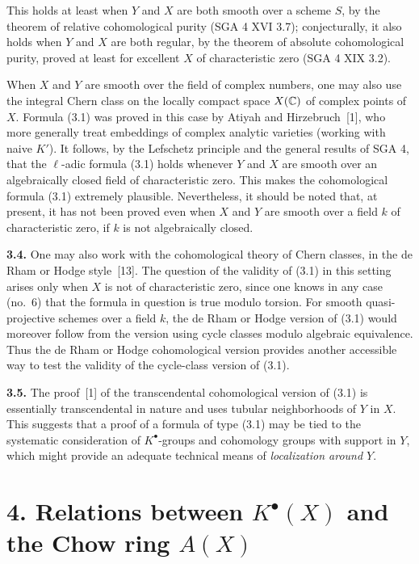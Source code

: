 This holds at least when $Y$ and $X$ are both smooth over a scheme $S$, by the
theorem of relative cohomological purity (SGA 4 XVI 3.7); conjecturally, it
also holds when $Y$ and $X$ are both regular, by the theorem of absolute
cohomological purity, proved at least for excellent $X$ of characteristic
zero (SGA 4 XIX 3.2).

When $X$ and $Y$ are smooth over the field of complex numbers, one may also
use the integral Chern class on the locally compact space $X(\mathbb C)$ of complex
points of $X$. Formula (3.1) was proved in this case by Atiyah and
Hirzebruch~[1], who more generally treat embeddings of complex analytic
varieties (working with naive $K'$). It follows, by the Lefschetz principle
and the general results of SGA 4, that the $\ell$-adic formula (3.1) holds
whenever $Y$ and $X$ are smooth over an algebraically closed field of
characteristic zero. This makes the cohomological formula (3.1) extremely
plausible. Nevertheless, it should be noted that, at present, it has not been
proved even when $X$ and $Y$ are smooth over a field $k$ of characteristic
zero, if $k$ is not algebraically closed.

\noindent\textbf{3.4.}
One may also work with the cohomological theory of Chern classes, in the de
Rham or Hodge style~[13]. The question of the validity of (3.1) in this
setting arises only when $X$ is not of characteristic zero, since one knows
in any case (no.~6) that the formula in question is true modulo torsion. For
smooth quasi-projective schemes over a field $k$, the de Rham or Hodge
version of (3.1) would moreover follow from the version using cycle classes
modulo algebraic equivalence. Thus the de Rham or Hodge cohomological version
provides another accessible way to test the validity of the cycle-class
version of (3.1).

\noindent\textbf{3.5.}
The proof~[1] of the transcendental cohomological version of (3.1) is
essentially transcendental in nature and uses tubular neighborhoods of $Y$
in $X$. This suggests that a proof of a formula of type (3.1) may be tied to
the systematic consideration of $K^\bullet$-groups and cohomology groups with
support in $Y$, which might provide an adequate technical means of
\emph{localization around $Y$}.

\section*{4. Relations between $K^\bullet(X)$ and the Chow ring $A(X)$}

